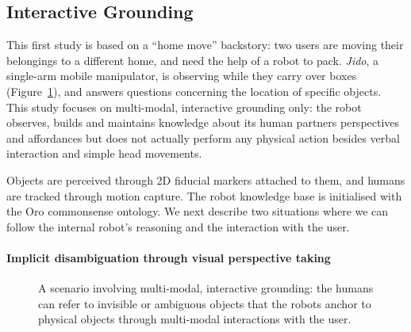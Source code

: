 \documentclass[preprint,3p,times]{elsarticle}
\begin{document}
\subsection{Interactive Grounding}
\label{moving-london}

This first study is based on a ``home move'' backstory: two users are moving
their belongings to a different home, and need the help of a robot to pack.
\emph{Jido}, a single-arm mobile manipulator, is observing while they carry
over boxes (Figure~\ref{fig:interactive-grounding}), and answers questions concerning the
location of specific objects.  This study focuses on multi-modal, interactive
grounding only: the robot observes, builds and maintains knowledge about its human
partners perspectives and affordances but does not actually perform any physical action besides
verbal interaction and simple head movements.

Objects are perceived through 2D fiducial markers attached to them, and humans are
tracked through motion capture. The robot knowledge base is initialised with
the {\sc Oro} commonsense ontology.  We next describe two
situations where we can follow the internal robot's reasoning and the
interaction with the user.

\paragraph{Implicit disambiguation through visual perspective taking}

\begin{figure}[!ht]
  \centering
    \caption{A scenario involving multi-modal, interactive grounding: the humans
    can refer to invisible or ambiguous objects that the robots anchor to
    physical objects through multi-modal interactions with the user.}
    \label{fig:interactive-grounding}
\end{figure}
\end{document}
